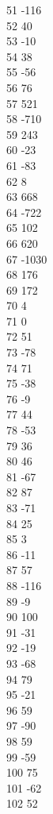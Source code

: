 { 51	-116 \\
 52	40 \\
 53	-10 \\
 54	38 \\
 55	-56 \\
 56	76 \\
 57	521 \\
 58	-710 \\
 59	243 \\
 60	-23 \\
 61	-83 \\
 62	8 \\
 63	668 \\
 64	-722 \\
 65	102 \\
 66	620 \\
 67	-1030 \\
 68	176 \\
 69	172 \\
 70	4 \\
 71	0 \\
 72	51 \\
 73	-78 \\
 74	71 \\
 75	-38 \\
 76	-9 \\
 77	44 \\
 78	-53 \\
 79	36 \\
 80	46 \\
 81	-67 \\
 82	87 \\
 83	-71 \\
 84	25 \\
 85	3 \\
 86	-11 \\
 87	57 \\
 88	-116 \\
 89	-9 \\
 90	100 \\
 91	-31 \\
 92	-19 \\
 93	-68 \\
 94	79 \\
 95	-21 \\
 96	59 \\
 97	-90 \\
 98	59 \\
 99	-59 \\
 100	75 \\
 101	-62 \\
 102	52 \\
}
